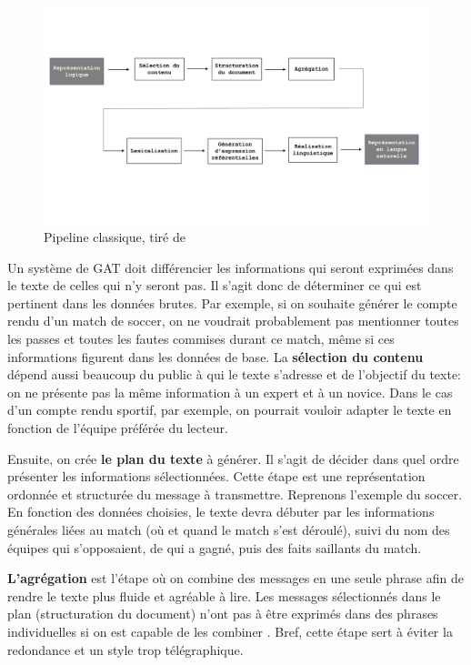 \begin{figure}[htb] %
	\centering
	\includegraphics[width=1\textwidth, trim = {0cm 5cm 0cm 0cm},clip]{ch2/figs/pipeline.pdf}
	\caption{Pipeline classique, tiré de \citep{ReiterBuildingNaturalLanguage2000}}
	\label{fig:Pipeline}
\end{figure}

Un système de \ac{GAT} doit différencier les informations qui seront exprimées dans le texte de celles qui n'y seront pas. Il s'agit donc de déterminer ce qui est pertinent dans les données brutes. Par exemple, si on souhaite générer le compte rendu d'un match de soccer, on ne voudrait probablement pas mentionner toutes les passes et toutes les fautes commises durant ce match, même si ces informations figurent dans les données de base. La \textbf{sélection du contenu} dépend aussi beaucoup du public à qui le texte s'adresse et de l'objectif du texte: on ne présente pas la même information à un expert et à un novice. Dans le cas d'un compte rendu sportif, par exemple, on pourrait vouloir adapter le texte en fonction de l'équipe préférée du lecteur.

Ensuite, on crée \textbf{le plan du texte} à générer. Il s'agit de décider dans quel ordre présenter les informations sélectionnées. Cette étape est une représentation ordonnée et structurée du message à transmettre. Reprenons l'exemple du soccer. En fonction des données choisies, le texte devra débuter par les informations générales liées au match (où et quand le match s'est déroulé), suivi du nom des équipes qui s'opposaient, de qui a gagné, puis des faits saillants du match.

\textbf{L'agrégation} est l'étape où on combine des messages en une seule phrase afin de rendre le texte plus fluide et agréable à lire. Les messages sélectionnés dans le plan (structuration du document) n'ont pas à être exprimés dans des phrases individuelles si on est capable de les combiner \citep{ChengCapturingInteractionAggregation2000}. Bref, cette étape sert à éviter la redondance et un style trop télégraphique.

